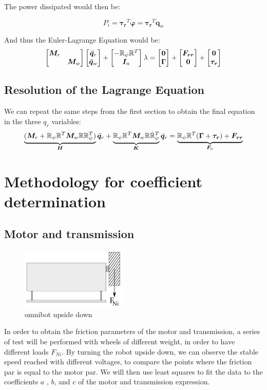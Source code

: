\documentclass[twoside,onecolumn]{article}
\let\oldsection\section
\renewcommand\section{\Needspace{16\baselineskip}\oldsection}
\let\oldsubsection\subsection
\renewcommand\subsection{\Needspace{13\baselineskip}\oldsubsection}
\renewcommand{\vec}[1]{\bm{#1}}
\newcommand{\R}{\mathbb R}
\newcommand{\mat}[2][b]{\begin{#1matrix}#2\end{#1matrix}}
\begin{document}
The power dissipated would then be:

$$P_i = \vec{\tau_r}^T \dot{\vec{\varphi}} = \vec{\tau_r}^T \dot{\vec{q}}_w$$

And thus the Euler-Lagrange Equation would be:
\begin{gather}
\mat{\M_r & \\ & \M_w}\mat{\ddot \q_r\\\ddot \q_w}+
\mat{
	-\R_{\psi}\R ^T  \\
	\vec I_n}\lambda
=\mat{\vec 0\\\Torque} + \mat{\vec{F_{rr}}\\\vec{0}} + \mat{\vec 0\\\vec{\tau_r}} \label{eq:sol6}
\end{gather}

\subsection{Resolution of the Lagrange Equation}

We can repeat the same steps from the first section to obtain the final equation in the three $q_r$ variables:
\begin{gather}
\underbrace{(\M_r+\R_{\psi}\R ^T
	\M_w\R \R_{\psi}^T)}_{\vec H}\ddot \q_r+
\underbrace{\R_{\psi}\R ^T\M_w\R \dot{\R}_{\psi}^T}_{\vec K}\dot \q_r=\underbrace{\R_{\psi}\R ^T(\Torque+\vec{\tau_r}) + \vec{F_{rr}}}_{\F_a} \label{eq:solution1}
\end{gather}

\section{Methodology for coefficient determination}

\subsection{Motor and transmission}

\begin{figure}%
	\includegraphics[width=50mm]{images/panzarriba.png}
	\caption{omnibot upside down}
	\label{fig:fig02}
\end{figure}
In order to obtain the friction parameters of the motor and transmission, a series of test will be performed with wheels of different weight, in order to have different loads $F_{Ni}$. By turning the robot upside down, we can observe the stable speed reached with different voltages, to compare the points where the friction par is equal to the motor par. We will then use least squares to fit the data to the coefficients $a$ , $b$, and $c$ of the motor and transmission expression.
\end{document}
